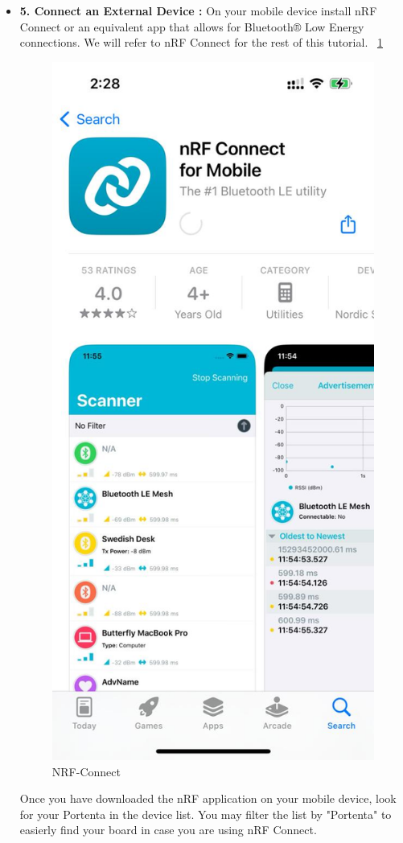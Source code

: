 \begin{itemize}
				\item \textbf{5.  Connect an External Device :} On your mobile device install nRF Connect or an equivalent app that allows for Bluetooth® Low Energy connections. We will refer to nRF Connect for the rest of this tutorial. ~\ref{NRF-Connect}
					\begin{figure}
						\begin{center}
							\includegraphics[width=0.7\linewidth]{Images/PortentaH7/NRF-Connect.jpg}
							\caption{NRF-Connect}
							\label{NRF-Connect}
						\end{center}
					\end{figure}
				Once you have downloaded the nRF application on your mobile device, look for your Portenta in the device list. You may filter the list by "Portenta" to easierly find your board in case you are using nRF Connect.
				

\end{itemize}
